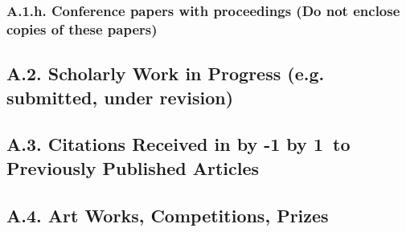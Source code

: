 \documentclass[10pt]{article}
\newcommand\LastYear{%
  \advance\year by -1 \the\year\advance\year by 1}
\begin{document}
\subsubsection*{A.1.h. Conference papers with proceedings (Do not enclose copies of these papers)}



\subsection*{A.2. Scholarly Work in Progress (e.g. submitted, under revision)}



\subsection*{A.3. Citations Received in \LastYear ~to Previously Published Articles}



\subsection*{A.4. Art Works, Competitions, Prizes}
\end{document}
